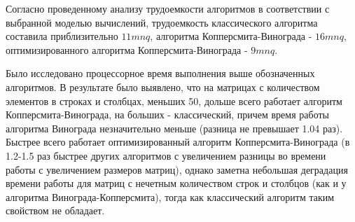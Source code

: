 \documentclass[a4paper,oneside,14pt]{extreport}
\begin{document}
Согласно проведенному анализу трудоемкости алгоритмов в соответствии с выбранной моделью вычислений, трудоемкость классического алгоритма составила приблизительно $11mnq$, алгоритма Копперсмита-Винограда - $16mnq$, оптимизированного алгоритма Копперсмита-Винограда - $9mnq$.

Было исследовано процессорное время выполнения выше обозначенных алгоритмов. В результате было выявлено, что на матрицах с количеством элементов в строках и столбцах, меньших 50, дольше всего работает алгоритм Копперсмита-Винограда, на больших - классический, причем время работы алгоритма Винограда незначительно меньше (разница не превышает 1.04 раз). Быстрее всего работает оптимизированный алгоритм Копперсмита-Винограда (в 1.2-1.5 раз быстрее других алгоритмов с увеличением разницы во времени работы с увеличением размеров матриц), однако заметна небольшая деградация времени работы для матриц с нечетным количеством строк и столбцов (как и у алгоритма Винограда-Копперсмита), тогда как классический алгоритм таким свойством не обладает.

\newpage
{}



\nocite{*}
\end{document}
